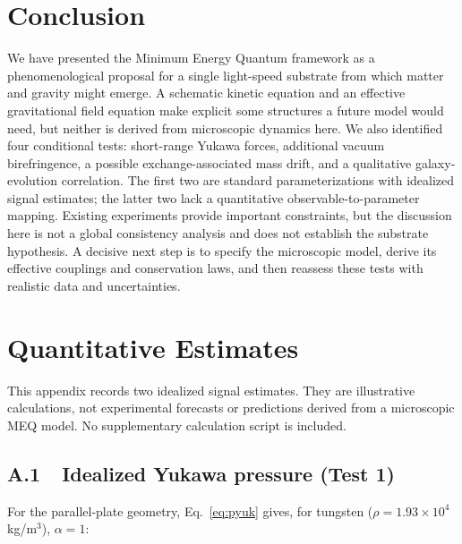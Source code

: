 \documentclass[11pt,a4paper]{article}
\newcommand{\meq}{MEQ}
\begin{document}
\section{Conclusion}\label{sec:conclusion}

We have presented the Minimum Energy Quantum framework as a phenomenological proposal for a
single light-speed substrate from which matter and gravity might emerge. A schematic kinetic
equation and an effective gravitational field equation make explicit some structures a future
model would need, but neither is derived from microscopic dynamics here. We also identified four
conditional tests: short-range Yukawa forces, additional vacuum birefringence, a possible
exchange-associated mass drift, and a qualitative galaxy-evolution correlation. The first two
are standard parameterizations with idealized signal estimates; the latter two lack a quantitative
observable-to-parameter mapping. Existing experiments provide important constraints, but the
discussion here is not a global consistency analysis and does not establish the substrate
hypothesis. A decisive next step is to specify the microscopic model, derive its effective
couplings and conservation laws, and then reassess these tests with realistic data and
uncertainties.

\appendix

\section{Quantitative Estimates}\label{app:quant}

This appendix records two idealized signal estimates. They are illustrative calculations, not
experimental forecasts or predictions derived from a microscopic \meq{} model. No supplementary
calculation script is included.

\subsection*{A.1\ \ Idealized Yukawa pressure (Test 1)}

For the parallel-plate geometry, Eq.~\eqref{eq:pyuk} gives, for tungsten
($\rho = 1.93\times10^{4}\,$kg/m$^3$), $\alpha = 1$:
\end{document}

